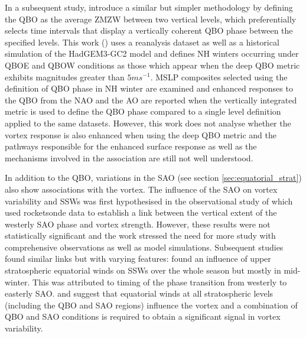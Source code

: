 In a subsequent study, \cite{andrewsObserved2019d} introduce a similar but simpler methodology by defining the QBO as the average ZMZW between two vertical levels, which preferentially selects time intervals that display a vertically coherent QBO phase between the specified levels. This work (\cite{andrewsObserved2019d}) uses a reanalysis dataset as well as a historical simulation of the HadGEM3-GC2 model and defines NH winters occurring under QBOE and QBOW conditions as those which appear when the deep QBO metric exhibits magnitudes greater than $5ms^{-1}$. MSLP composites selected using the definition of QBO phase in NH winter are examined and enhanced responses to the QBO from the NAO and the AO are reported when the vertically integrated metric is used to define the QBO phase compared to a single level definition applied to the same datasets. However, this work does not analyse whether the vortex response is also enhanced when using the deep QBO metric and the pathways responsible for the enhanced surface response as well as the mechanisms involved in the association are still not well understood. 

In addition to the QBO, variations in the SAO (see section \ref{sec:equatorial_strat}) also show associations with the vortex. The influence of the SAO on vortex variability and SSWs was first hypothesised in the observational study of \cite{grayData2001} which used rocketsonde data to establish a link between the vertical extent of the westerly SAO phase and vortex strength. However, these results were not statistically significant and the work stressed the need for more study with comprehensive observations as well as model simulations. Subsequent studies found similar links but with varying features: \cite{grayinfluence2003} found an influence of upper stratospheric equatorial winds on SSWs over the whole season but mostly in mid-winter. This was attributed to timing of the phase transition from westerly to easterly SAO. \cite{grayData2001} and \cite{hamiltonEffects1998} suggest that equatorial winds at all stratospheric levels (including the QBO and SAO regions) influence the vortex and a combination of QBO and SAO conditions is required to obtain a significant signal in vortex variability.

